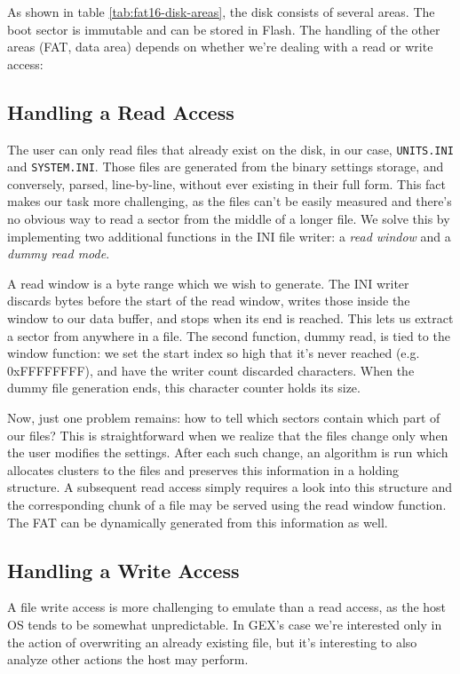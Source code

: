 As shown in table \ref{tab:fat16-disk-areas}, the disk consists of several areas. The boot sector is immutable and can be stored in Flash. The handling of the other areas (\gls{FAT}, data area) depends on whether we're dealing with a read or write access:

\subsection{Handling a Read Access}

The user can only read files that already exist on the disk, in our case, \verb|UNITS.INI| and \verb|SYSTEM.INI|. Those files are generated from the binary settings storage, and conversely, parsed, line-by-line, without ever existing in their full form. This fact makes our task more challenging, as the files can't be easily measured and there's no obvious way to read a sector from the middle of a longer file. We solve this by implementing two additional functions in the INI file writer: a \textit{read window} and a \textit{dummy read mode}.

A read window is a byte range which we wish to generate. The INI writer discards bytes before the start of the read window, writes those inside the window to our data buffer, and stops when its end is reached. This lets us extract a sector from anywhere in a file. The second function, dummy read, is tied to the window function: we set the start index so high that it's never reached (e.g. 0xFFFFFFFF), and have the writer count discarded characters. When the dummy file generation ends, this character counter holds its size.

Now, just one problem remains: how to tell which sectors contain which part of our files? This is straightforward when we realize that the files change only when the user modifies the settings. After each such change, an algorithm is run which allocates clusters to the files and preserves this information in a holding structure. A subsequent read access simply requires a look into this structure and the corresponding chunk of a file may be served using the read window function. The \gls{FAT} can be dynamically generated from this information as well.

\subsection{Handling a Write Access}

A file write access is more challenging to emulate than a read access, as the host OS tends to be somewhat unpredictable. In GEX's case we're interested only in the action of overwriting an already existing file, but it's interesting to also analyze other actions the host may perform.

